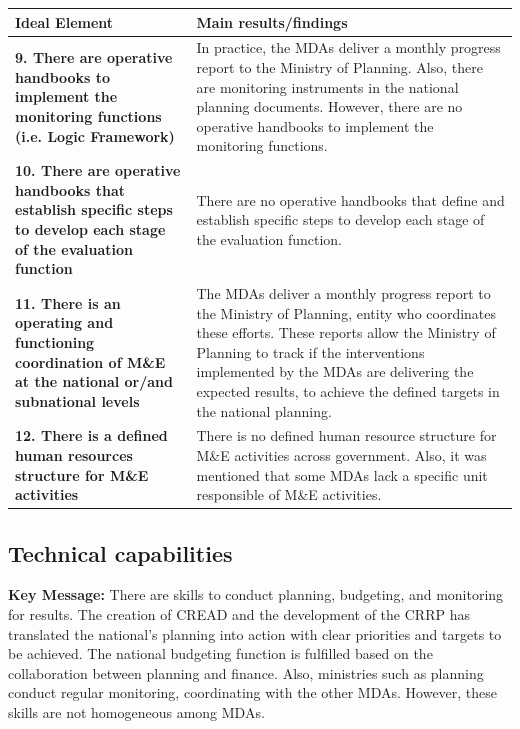 \documentclass[
  10pt,
]{book}
\begin{document}
\begin{tabu} to 
\hline
Ideal Element & Main results/findings\\
\hline
\textbf{9. There are operative handbooks to implement the monitoring functions (i.e. Logic Framework)} & In practice, the MDAs deliver a monthly progress report to the Ministry of Planning. Also, there are monitoring instruments in the national planning documents. However, there are no operative handbooks to implement the monitoring functions.\\
\hline
\textbf{10. There are operative handbooks that establish specific steps to develop each stage of the evaluation function} & There are no operative handbooks that define and establish specific steps to develop each stage of the evaluation function.\\
\hline
\textbf{11. There is an operating and functioning coordination of M\&E at the national or/and subnational levels} & The MDAs deliver a monthly progress report to the Ministry of Planning, entity who coordinates these efforts. These reports allow the Ministry of Planning to track if the interventions implemented by the MDAs are delivering the expected results, to achieve the defined targets in the national planning.\\
\hline
\textbf{12. There is a defined human resources structure for M\&E activities} & There is no defined human resource structure for M\&E activities across government. Also, it was mentioned that some MDAs lack a specific unit responsible of M\&E activities.\\
\hline
\end{tabu}
\endgroup{}

\hypertarget{technical-capabilities}{%
\subsection{Technical capabilities}\label{technical-capabilities}}

\textbf{Key Message:}
There are skills to conduct planning, budgeting, and monitoring for results. The creation of CREAD and the development of the CRRP has translated the national's planning into action with clear priorities and targets to be achieved. The national budgeting function is fulfilled based on the collaboration between planning and finance. Also, ministries such as planning conduct regular monitoring, coordinating with the other MDAs. However, these skills are not homogeneous among MDAs.
\end{document}
